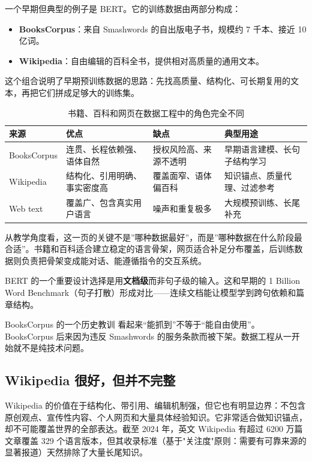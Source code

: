 \documentclass[a4paper]{article}
\begin{document}
一个早期但典型的例子是 BERT。它的训练数据由两部分构成：
\begin{itemize}
    \item \textbf{BooksCorpus}：来自 Smashwords 的自出版电子书，规模约 7 千本、接近 10 亿词。
    \item \textbf{Wikipedia}：自由编辑的百科全书，提供相对高质量的通用文本。
\end{itemize}

这个组合说明了早期预训练数据的思路：先找高质量、结构化、可长期复用的文本，再把它们拼成足够大的训练集。

\begin{table}[H]
\centering
\begin{tabular}{p{}p{}p{}p{}}
\toprule
\textbf{来源} & \textbf{优点} & \textbf{缺点} & \textbf{典型用途} \\
\midrule
BooksCorpus & 连贯、长程依赖强、语体自然 & 授权风险高、来源不透明 & 早期语言建模、长句子结构学习 \\
Wikipedia & 结构化、引用明确、事实密度高 & 覆盖面窄、语体偏百科 & 知识锚点、质量代理、过滤参考 \\
Web text & 覆盖广、包含真实用户语言 & 噪声和重复极多 & 大规模预训练、长尾补充 \\
\bottomrule
\end{tabular}
\caption{书籍、百科和网页在数据工程中的角色完全不同}
\end{table}

从教学角度看，这一页的关键不是”哪种数据最好”，而是”哪种数据在什么阶段最合适”。书籍和百科适合建立稳定的语言骨架，网页适合补足分布覆盖，后训练数据则负责把骨架变成能对话、能遵循指令的交互系统。

BERT 的一个重要设计选择是用\textbf{文档级}而非句子级的输入。这和早期的 1 Billion Word Benchmark（句子打散）形成对比——连续文档能让模型学到跨句依赖和篇章结构。

\begin{warningbox}{BooksCorpus 的一个历史教训}
看起来“能抓到”不等于“能自由使用”。BooksCorpus 后来因为违反 Smashwords 的服务条款而被下架。数据工程从一开始就不是纯技术问题。
\end{warningbox}

\subsection{Wikipedia 很好，但并不完整}

Wikipedia 的价值在于结构化、带引用、编辑机制强，但它也有明显边界：不包含原创观点、宣传性内容、个人网页和大量具体经验知识。它非常适合做知识锚点，却不可能覆盖世界的全部表达。截至 2024 年，英文 Wikipedia 有超过 6200 万篇文章覆盖 329 个语言版本，但其收录标准（基于"关注度"原则：需要有可靠来源的显著报道）天然排除了大量长尾知识。
\end{document}
